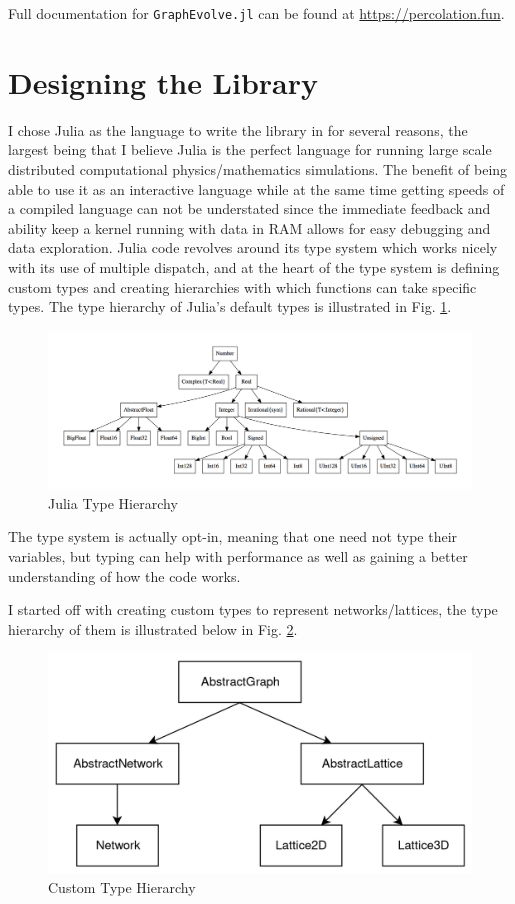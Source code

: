 Full documentation for \texttt{GraphEvolve.jl} can be found at \href{https://percolation.fun}{https://percolation.fun}.

\section{Designing the Library}
I chose Julia as the language to write the library in for several reasons, the largest being that I believe Julia is the perfect language for running large scale distributed computational physics/mathematics simulations.
The benefit of being able to use it as an interactive language while at the same time getting speeds of a compiled language can not be understated since the immediate feedback and ability keep a kernel running with data in RAM allows for easy debugging and data exploration.
Julia code revolves around its type system which works nicely with its use of multiple dispatch, and at the heart of the type system is defining custom types and creating hierarchies with which functions can take specific types.
The type hierarchy of Julia's default types is illustrated in Fig. \ref{fig:julia_type_hierarchy}.

\begin{figure}[H]
	\centering
	\includegraphics[width=400pt]{images/julia_type_hierarchy.png}
	\caption{Julia Type Hierarchy}
	\label{fig:julia_type_hierarchy}
\end{figure}

The type system is actually opt-in, meaning that one need not type their variables, but typing can help with performance as well as gaining a better understanding of how the code works.

I started off with creating custom types to represent networks/lattices, the type hierarchy of them is illustrated below in Fig. \ref{fig:custom_type_hierarchy}.

\begin{figure}[H]
	\centering
	\includegraphics[width=350pt]{images/custom_type_hierarchy.png}
	\caption{Custom Type Hierarchy}
	\label{fig:custom_type_hierarchy}
\end{figure}

